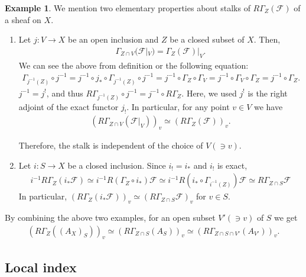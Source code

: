 \documentclass[a4paper,dvipdfmx,reqno,12pt]{amsart}
\theoremstyle{definition}
\newtheorem{example}[theorem]{Example}
\newcommand{\mcal}[1]{\mathcal{#1}}%
\numberwithin{equation}{section}
\begin{document}
\begin{example}

We mention two elementary properties 
about stalks of $R\Gamma_{Z}(\mcal{F})$ of a sheaf on 
$X$.

\begin{enumerate}
\item Let $j:V\to X$ be an open inclusion and $Z$ be a 
closed subset of $X$. Then, 
\begin{align}
\Gamma_{Z\cap V}(\mathcal{F}|_V)=\Gamma_{Z}(\mathcal{F})|_V.
\end{align}
We can see the above from definition or the following 
equation:
\begin{align}
\Gamma_{j^{-1}(Z)} \circ j^{-1}
=j^{-1}\circ j_*\circ \Gamma_{j^{-1}(Z)} \circ j^{-1}
=j^{-1}\circ\Gamma_{Z}\circ \Gamma_V
=j^{-1}\circ \Gamma_V \circ \Gamma_Z
=j^{-1} \circ \Gamma_Z.
\end{align}
$j^{-1}=j^{!}$, and thus 
$R\Gamma_{j^{-1}(Z)} \circ j^{-1}=j^{-1}\circ R\Gamma_Z$.
Here, we used $j^{!}$ is the right adjoint of 
the exact functor $j_!$.
In particular, for any point $v\in V$ we have
\begin{align}
(R\Gamma_{Z\cap V}(\mcal{F}|_{V}))_v\simeq 
(R\Gamma_{Z}(\mcal{F}))_v.
\end{align}



Therefore, the stalk is independent of 
the choice of $V (\ni v)$.
\item Let $i: S\to X$ be a closed inclusion.
Since $i_!=i_*$ and $i_!$ is exact,
\begin{align}
  i^{-1}R\Gamma_{Z}(i_*\mcal{F})\simeq 
i^{-1}R(\Gamma_{Z}\circ i_*)\mcal{F}
  \simeq i^{-1}R(i_*\circ \Gamma_{i^{-1}(Z)})\mcal{F}
  \simeq R\Gamma_{Z\cap S}\mcal{F}
\end{align}
In particular, $(R\Gamma_{Z}(i_*\mcal{F}))_v
  \simeq (R\Gamma_{Z\cap S}\mcal{F})_v$ for $v\in S$.
\end{enumerate}

By combining the above two examples, for an open 
subset $V' (\ni v)$ of $S$ we get 
\begin{align} \label{equation-local-stalk}
(R\Gamma_{Z}((A_{X})_S))_v\simeq 
(R\Gamma_{Z\cap S}(A_{S}))_v\simeq
(R\Gamma_{Z\cap S\cap V'}(A_{V'}))_v.
\end{align}

\end{example}




\subsection{Local index}
\end{document}
